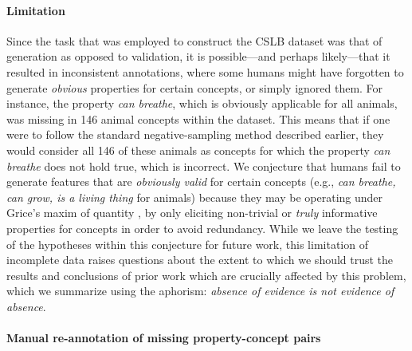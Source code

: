 \documentclass[11pt]{article}    %
\begin{document}
\paragraph{Limitation} Since the task that was employed to construct the CSLB dataset was that of generation as opposed to validation, it is possible---and perhaps likely---that it resulted in inconsistent annotations, where some humans might have forgotten to generate \textit{obvious} properties for certain concepts, or simply ignored them. For instance, the property \textit{can breathe}, which is obviously applicable for all animals, was missing in 146 animal concepts within the dataset. This means that if one were to follow the standard negative-sampling method described earlier, they would consider all 146 of these animals as concepts for which the property \textit{can breathe} does not hold true, which is incorrect. 
We conjecture that humans fail to generate features that are \textit{obviously valid} for certain concepts (e.g., \textit{can breathe, can grow, is a living thing} for animals) because they may be operating under Grice's maxim of quantity \citep{grice1989studies}, by only eliciting non-trivial or \textit{truly} informative properties for concepts in order to avoid redundancy.
While we leave the testing of the hypotheses within this conjecture for future work, this limitation of incomplete data raises questions about the extent to which we should trust the results and conclusions of prior work which are crucially affected by this problem, which we summarize using the aphorism: \textit{absence of evidence is not evidence of absence}.

\paragraph{Manual re-annotation of missing property-concept pairs}
\end{document}
